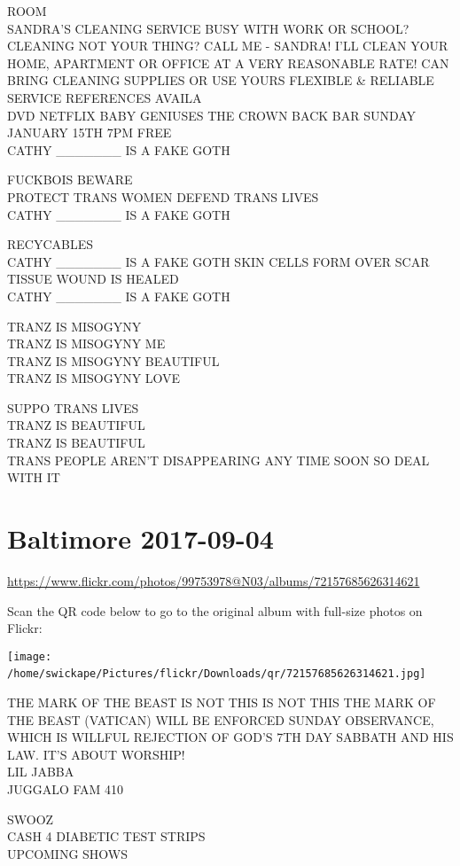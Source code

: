 \documentclass[10pt,letterpaper]{article}
\begin{document}
ROOM\\
SANDRA'S CLEANING SERVICE BUSY WITH WORK OR SCHOOL?  CLEANING NOT YOUR THING?  CALL ME {-} SANDRA!   I'LL CLEAN YOUR HOME, APARTMENT OR OFFICE AT A VERY REASONABLE RATE!  CAN BRING CLEANING SUPPLIES OR USE YOURS FLEXIBLE \& RELIABLE SERVICE REFERENCES AVAILA\\
DVD NETFLIX BABY GENIUSES THE CROWN BACK BAR SUNDAY JANUARY 15TH 7PM FREE\\
CATHY \_\_\_\_\_\_\_ IS A FAKE GOTH

FUCKBOIS BEWARE\\
PROTECT TRANS WOMEN DEFEND TRANS LIVES\\
CATHY \_\_\_\_\_\_\_ IS A FAKE GOTH

RECYCABLES\\
CATHY \_\_\_\_\_\_\_ IS A FAKE GOTH SKIN CELLS FORM OVER SCAR TISSUE WOUND IS HEALED\\
CATHY \_\_\_\_\_\_\_ IS A FAKE GOTH

TRANZ IS MISOGYNY\\
TRANZ IS MISOGYNY ME\\
TRANZ IS MISOGYNY BEAUTIFUL\\
TRANZ IS MISOGYNY LOVE

SUPPO TRANS LIVES\\
TRANZ IS BEAUTIFUL\\
TRANZ IS BEAUTIFUL\\
TRANS PEOPLE AREN'T DISAPPEARING ANY TIME SOON SO DEAL WITH IT
\

\section*{Baltimore 2017-09-04}

\url{https://www.flickr.com/photos/99753978@N03/albums/72157685626314621}

Scan the QR code below to go to the original album with full-size photos on Flickr:

\texttt{[image: /home/swickape/Pictures/flickr/Downloads/qr/72157685626314621.jpg]}
\

THE MARK OF THE BEAST IS NOT THIS IS NOT THIS THE MARK OF THE BEAST (VATICAN) WILL BE ENFORCED SUNDAY OBSERVANCE, WHICH IS WILLFUL REJECTION OF GOD'S 7TH DAY SABBATH AND HIS LAW.  IT'S ABOUT WORSHIP!\\
LIL JABBA\\
JUGGALO FAM 410

SWOOZ\\
CASH 4 DIABETIC TEST STRIPS\\
UPCOMING SHOWS
\end{document}
